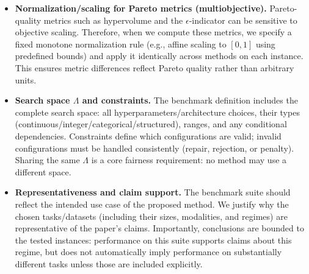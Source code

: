 \begin{itemize}
    \item \textbf{Normalization/scaling for Pareto metrics (multiobjective).}
    Pareto-quality metrics such as hypervolume and the \(\epsilon\)-indicator can be sensitive to objective scaling.
    Therefore, when we compute these metrics, we specify a fixed monotone normalization rule
    (e.g., affine scaling to \([0,1]\) using predefined bounds) and apply it identically across methods on each instance.
    This ensures metric differences reflect Pareto quality rather than arbitrary units.

    \item \textbf{Search space \(\Lambda\) and constraints.}
    The benchmark definition includes the complete search space:
    all hyperparameters/architecture choices, their types (continuous/integer/categorical/structured),
    ranges, and any conditional dependencies.
    Constraints define which configurations are valid; invalid configurations must be handled consistently
    (repair, rejection, or penalty).
    Sharing the same \(\Lambda\) is a core fairness requirement: no method may use a different space.

    \item \textbf{Representativeness and claim support.}
    The benchmark suite should reflect the intended use case of the proposed method.
    We justify why the chosen tasks/datasets (including their sizes, modalities, and regimes) are representative of the paper’s claims.
    Importantly, conclusions are bounded to the tested instances: performance on this suite supports claims about this regime,
    but does not automatically imply performance on substantially different tasks unless those are included explicitly.
\end{itemize}

